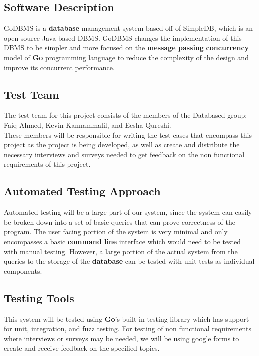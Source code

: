 \documentclass[12pt, titlepage]{article}
\begin{document}
\subsection{Software Description}

GoDBMS is a \textbf{database} management system based off of SimpleDB, which is an open source Java based DBMS. GoDBMS changes the implementation of this DBMS to be simpler and more focused on the \textbf{message passing} \textbf{concurrency} model of \textbf{Go} programming language to reduce the complexity of the design and improve its concurrent performance.

\subsection{Test Team}

The test team for this project consists of the members of the Databased group: Faiq Ahmed, Kevin Kannammalil, and Eesha Qureshi.\\

\noindent These members will be responsible for writing the test cases that encompass this project as the project is being developed, as well as create and distribute the necessary interviews and surveys needed to get feedback on the non functional requirements of this project.

\subsection{Automated Testing Approach}

Automated testing will be a large part of our system, since the system can easily be broken down into a set of basic queries that can prove correctness of the program. The user facing portion of the system is very minimal and only encompasses a basic \textbf{command line} interface which would need to be tested with manual testing. However, a large portion of the actual system from the queries to the storage of the \textbf{database} can be tested with unit tests as individual components.

\subsection{Testing Tools}

This system will be tested using \textbf{Go}'s built in testing library which has support for unit, integration, and fuzz testing. For testing of non functional requirements where interviews or surveys may be needed, we will be using google forms to create and receive feedback on the specified topics.
\end{document}
